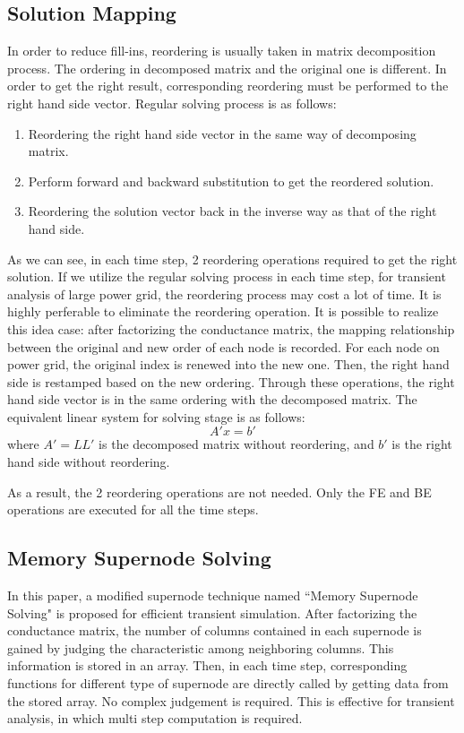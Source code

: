  \subsection{Solution Mapping}
In order to reduce fill-ins, reordering is usually taken in matrix decomposition process. The ordering in decomposed 
matrix and the original one is different. In order to get the right result, corresponding reordering must be performed to the right hand 
side vector. Regular solving process is as follows:
\begin{enumerate}[1)]
\item Reordering the right hand side vector in the same way of decomposing matrix.
\item Perform forward and backward substitution to get the reordered solution.
\item Reordering the solution vector back in the inverse way as that of the right hand side.
\end{enumerate}
As we can see, in each time step, 2 reordering operations required to get the right solution. If we utilize the regular solving process in each
time step, for transient analysis of large power grid, the reordering process may cost a lot of time. It is highly perferable to 
eliminate the reordering operation. It is possible to realize this idea case: after factorizing the conductance matrix, the mapping 
relationship between the original and new order of each node is recorded. For each node on power grid, the original index is renewed
into the new one. Then, the right hand side is restamped based on the new ordering. Through these operations, the right hand side vector is
in the same ordering with the decomposed matrix. The equivalent linear system for solving stage is as follows:
\begin{equation}
A'x = b'
\end{equation}
where $A'=LL'$ is the decomposed matrix without reordering, and $b'$ is the right hand side without reordering.

As a result, the 2 reordering operations are not needed. Only the FE and BE operations are executed for all the time steps.
  \subsection{Memory Supernode Solving}
In this paper, a modified supernode technique named ``Memory Supernode Solving" is proposed for efficient transient simulation. After 
factorizing the conductance matrix, the number of columns contained in each supernode is gained by judging the characteristic among 
neighboring columns. This information is stored in an array. Then, in each time step, corresponding functions for different type of 
supernode are directly called by getting data from the stored array. No complex judgement is required. This is effective for transient
analysis, in which multi step computation is required.  
